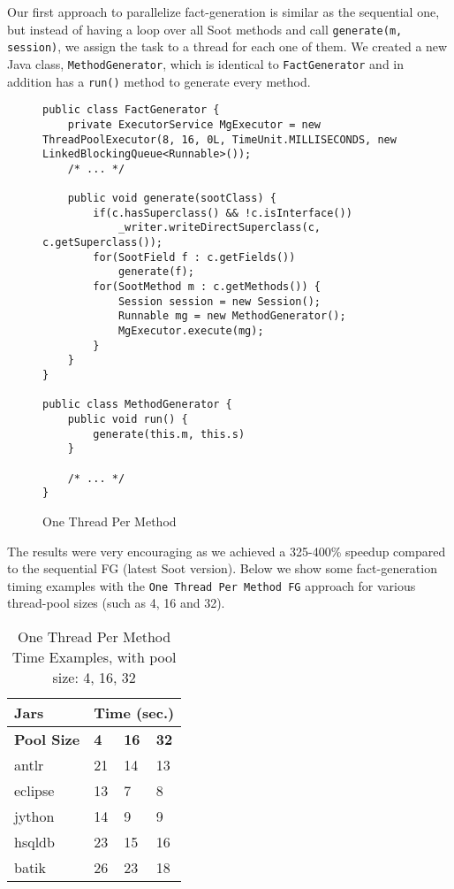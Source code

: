 \documentclass{dithesis}
\begin{document}
        Our first approach to parallelize fact-generation is similar as the sequential one, but instead of having a loop over all Soot methods and call \texttt{generate(m, session)}, we assign the task to a thread for each one of them. We created a new Java class, \texttt{MethodGenerator}, which is identical to \texttt{FactGenerator} and in addition has a \texttt{run()} method to generate every method.
        \begin{figure}[H]
\begin{lstlisting}
public class FactGenerator {
    private ExecutorService MgExecutor = new ThreadPoolExecutor(8, 16, 0L, TimeUnit.MILLISECONDS, new LinkedBlockingQueue<Runnable>());
    /* ... */

    public void generate(sootClass) {
        if(c.hasSuperclass() && !c.isInterface())
            _writer.writeDirectSuperclass(c, c.getSuperclass());
        for(SootField f : c.getFields())
            generate(f);
        for(SootMethod m : c.getMethods()) {
            Session session = new Session();
            Runnable mg = new MethodGenerator();
            MgExecutor.execute(mg);
        }
    }
}

public class MethodGenerator {
    public void run() {
        generate(this.m, this.s)
    }

    /* ... */
}
\end{lstlisting}
        \caption{One Thread Per Method}
        \end{figure}

        The results were very encouraging as we achieved a 325-400\% speedup compared to the sequential FG (latest Soot version). Below we show some fact-generation timing examples with the \texttt{One Thread Per Method FG} approach for various thread-pool sizes (such as 4, 16 and 32).
		\begin{table}[H]
			\centering
            \begin{tabular}{@{}l|lll@{}}
            \toprule
            \textbf{Jars}    	& \multicolumn{3}{l}{\textbf{Time (sec.)}}  \\ \midrule
            \textbf{Pool Size} 	& \textbf{4}  & \textbf{16}  & \textbf{32}  \\ \midrule
            antlr            	& 21          & 14           & 13           \\
            eclipse          	& 13          & 7            & 8            \\
            jython           	& 14          & 9            & 9            \\
            hsqldb           	& 23          & 15           & 16           \\
            batik            	& 26          & 23           & 18           \\ \bottomrule
            \end{tabular}
            \newline
			\caption[One Thread Per Method Time Examples]{One Thread Per Method Time Examples, with pool size: 4, 16, 32}
		\end{table}
\end{document}
